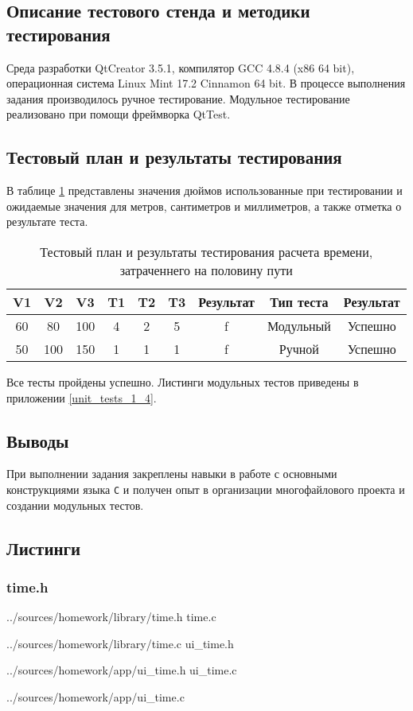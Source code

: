 \documentclass[12pt,a4paper]{report}
\begin{document}
\subsection{Описание тестового стенда и методики тестирования}
\hspace{\parindent}Среда разработки QtCreator 3.5.1, компилятор GCC 4.8.4 (x86 64 bit), операционная система Linux Mint 17.2 Cinnamon 64 bit.
В процессе выполнения задания производилось ручное тестирование.
Модульное тестирование реализовано при помощи фреймворка QtTest.

\subsection{Тестовый план и результаты тестирования}
\hspace{\parindent}В таблице \ref{time_test_plan} представлены значения дюймов использованные при тестировании и ожидаемые значения для метров, сантиметров и миллиметров, а также отметка о результате теста.
\FloatBarrier
\begin{table}[h]
\caption{Тестовый план и результаты тестирования расчета времени, затраченнего на половину пути}
\label{time_test_plan}
\begin{tabular}{| c c c | c c c | c | c | c |}
\hline 
V1 & V2 & V3 & T1 & T2 & T3 & Результат & Тип теста & Результат \\ 
\hline 
60 & 80 & 100 & 4 & 2 & 5 & f & Модульный & Успешно \\ 
\hline 
50 & 100 & 150 & 1 & 1 & 1 & f & Ручной & Успешно \\ 
\hline 
\end{tabular} 
\end{table}
\FloatBarrier
Все тесты пройдены успешно. Листинги модульных тестов приведены в приложении \ref{unit_tests_1_4}.
\subsection{Выводы}
\hspace{\parindent}При выполнении задания закреплены навыки в работе с основными конструкциями языка \verb+C+ и получен опыт в организации многофайлового проекта и создании модульных тестов.

\newpage
\subsection{Листинги}
\subsubsection*{time.h}

{../sources/homework/library/time.h}
time.c

{../sources/homework/library/time.c}
ui\_time.h

{../sources/homework/app/ui_time.h}
ui\_time.c

{../sources/homework/app/ui_time.c}
\newpage
\end{document}
